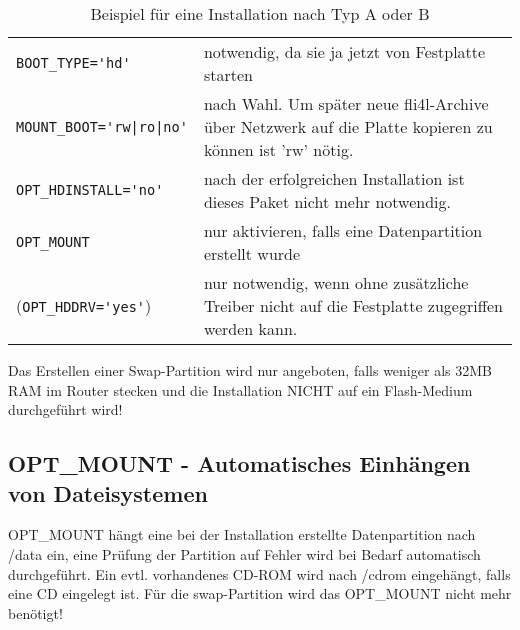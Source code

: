 \begin{table}[htb]
  \begin{center}
    \begin{small}
    \begin{tabular}{lp{9cm}}
    \verb*?BOOT_TYPE='hd'? & notwendig, da sie ja jetzt von Festplatte starten\\
    \verb*?MOUNT_BOOT='rw|ro|no'? &
                        nach Wahl. Um später neue fli4l-Archive über Netzwerk
                        auf die Platte kopieren zu können ist 'rw' nötig.\\

    \verb*?OPT_HDINSTALL='no'? & nach der erfolgreichen Installation ist dieses Paket
                        nicht mehr notwendig.\\


    \verb*?OPT_MOUNT? & nur aktivieren, falls eine Datenpartition erstellt wurde\\

    (\verb*?OPT_HDDRV='yes'?) & nur notwendig, wenn ohne zusätzliche Treiber nicht auf die
        Festplatte zugegriffen werden kann.\\
    
    \end{tabular}
    \end{small}
    \caption{Beispiel für eine Installation nach Typ A oder B}
  \end{center}
\end{table}

    Das Erstellen einer Swap-Partition wird nur angeboten, falls weniger als 32MB 
    RAM im Router stecken und die Installation NICHT auf ein Flash-Medium durchgeführt wird!

\subsection {OPT\_MOUNT - Automatisches Einhängen von Dateisystemen}

    OPT\_MOUNT hängt eine bei der Installation erstellte Datenpartition nach /data ein, 
    eine Prüfung der Partition auf Fehler wird bei Bedarf automatisch durchgeführt. 
    Ein evtl. vorhandenes CD-ROM wird nach /cdrom eingehängt, falls eine CD eingelegt ist.
    Für die swap-Partition wird das OPT\_MOUNT nicht mehr benötigt!

   

